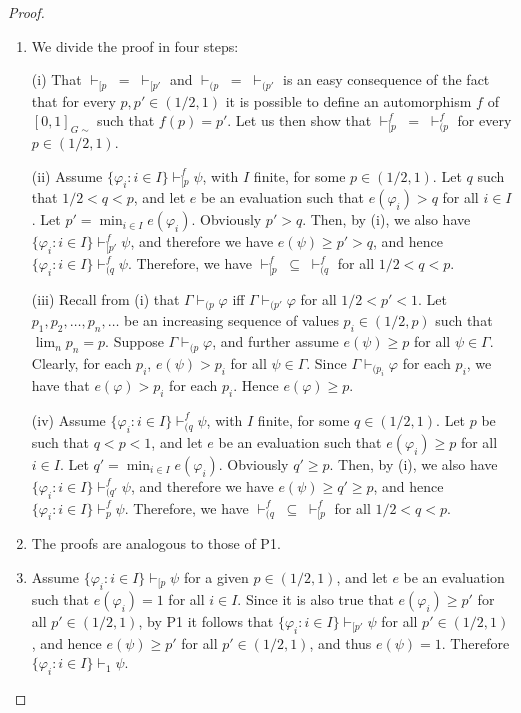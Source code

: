 \documentclass{article}
\theoremstyle{definition}
\begin{document}
\begin{proof}  \mbox{}

\begin{enumerate}
\item[P1.]  We divide the proof in four steps:

(i) That $\vdash_{[p} \; = \; \vdash_{[p'}$ and $\vdash_{(p} \; = \; \vdash_{(p'}$ is an easy consequence of the fact that for every $p, p' \in (1/2,1)$  it is possible to define an automorphism $f$ of $[0,1]_{G\sim}$ such that $f(p) = p'$. Let us then show that  $\vdash^f_{[p} \; =\;  \vdash^f_{(p}$ for every $p \in (1/2, 1)$.

(ii) Assume $\{\varphi_i : i \in I\} \vdash^f_{[p} \psi$, with $I$ finite, for some $p \in (1/2, 1)$. Let $q$ such that $1/2 < q < p$, and let $e$ be an evaluation such that $e(\varphi_i) > q $ for all $i \in I$. 
Let $p' = \min_{i \in I} e(\varphi_i)$. Obviously $p' > q$. Then, by (i), we also have $\{\varphi_i : i \in I\} \vdash^f_{[p'} \psi$, and therefore we have $e(\psi) \geq p' > q$, and hence $\{\varphi_i :  i \in I\} \vdash^f_{(q} \psi$. Therefore, we have $\vdash^f_{[p}  \; \subseteq  \; \vdash^f_{(q}$ for all $1/2 < q < p$.

(iii) Recall from (i) that $\Gamma \vdash_{(p} \varphi$ iff $\Gamma \vdash_{(p'} \varphi$ for all $1/2 < p' < 1$. Let $p_1, p_2, \ldots, p_n, \ldots $ be an increasing sequence of values $p_i \in (1/2, p)$ such that $\lim_n p_n = p$. 
%
Suppose $\Gamma \vdash_{(p} \varphi$, and further assume $e(\psi) \geq p$ for all $\psi \in \Gamma$. Clearly, for each $p_i$, $e(\psi) > p_i$ for all $\psi \in \Gamma$. Since $\Gamma \vdash_{(p_i} \varphi$ for each $p_i$, we have that $e(\varphi) > p_i$ for each $p_i$.  Hence $e(\varphi) \geq p$. 

(iv) Assume $\{\varphi_i :  i \in I\} \vdash^f_{(q} \psi$, with $I$ finite, for some $q \in (1/2, 1)$. Let $p$ be such that $ q < p < 1$, and let $e$ be an evaluation such that $e(\varphi_i) \geq p $ for all $i \in I$. 
Let $q' = \min_{i \in I} e(\varphi_i)$. Obviously $q' \geq p$. Then, by (i), we also have $\{\varphi_i :  i \in I\} \vdash^f_{(q'} \psi$, and therefore we have $e(\psi) \geq q' \geq p$, and hence $\{\varphi_i :  i \in I\} \vdash^f_{p} \psi$. Therefore, we have $\vdash^f_{(q}  \; \subseteq  \; \vdash^f_{[p}$ for all $1/2 < q < p$.

\item[P2.] The proofs are analogous to those of P1.

\item[P3.] Assume $\{\varphi_i :  i \in I\} \vdash_{[p} \psi$ for a given $p  \in (1/2,1)$, and let $e$ be an evaluation such that $e(\varphi_i) = 1$ for all $i \in I$. Since it is also true that $e(\varphi_i) \geq p'$ for all $p'  \in (1/2,1)$, by P1 it follows that $\{\varphi_i :  i \in I\} \vdash_{[p'} \psi$ for all $p'  \in (1/2,1)$, and hence $e(\psi) \geq p'$ for all $p'  \in (1/2,1)$, and thus $e(\psi) = 1$. Therefore $\{\varphi_i :  i \in I\} \vdash_1 \psi$.


\end{enumerate}
\end{proof}
\end{document}
